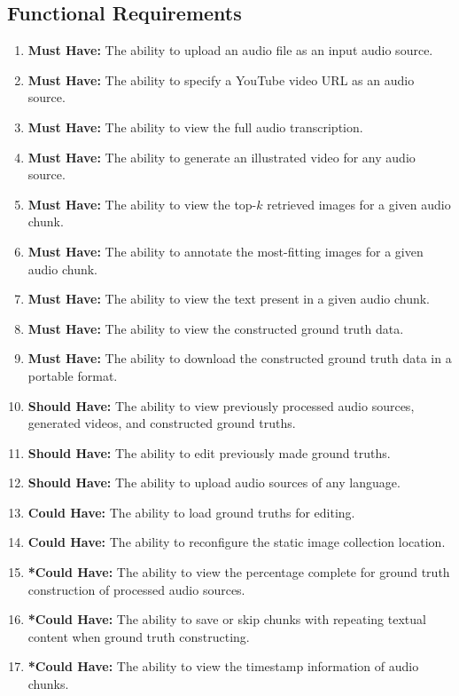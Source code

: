 \documentclass{l4proj}
\begin{document}
\subsection{Functional Requirements}
\begin{enumerate}
    \item \label{req:1} \textbf{Must Have:} The ability to upload an audio file as an input audio source.
    \item \label{req:2} \textbf{Must Have:} The ability to specify a YouTube video URL as an audio source.
    \item \label{req:3} \textbf{Must Have:} The ability to view the full audio transcription.
    \item \label{req:4} \textbf{Must Have:} The ability to generate an illustrated video for any audio source.
    \item \label{req:5} \textbf{Must Have:} The ability to view the top-$k$ retrieved images for a given audio chunk.
    \item \label{req:6} \textbf{Must Have:} The ability to annotate the most-fitting images for a given audio chunk.
    \item \label{req:7} \textbf{Must Have:} The ability to view the text present in a given audio chunk.
    \item \label{req:8} \textbf{Must Have:} The ability to view the constructed ground truth data.
    \item \label{req:9} \textbf{Must Have:} The ability to download the constructed ground truth data in a portable format.
    \item \label{req:10} \textbf{Should Have:} The ability to view previously processed audio sources, generated videos, and constructed ground truths.
    \item \label{req:11} \textbf{Should Have:} The ability to edit previously made ground truths.
    \item \label{req:12} \textbf{Should Have:} The ability to upload audio sources of any language.
    \item \label{req:13} \textbf{Could Have:} The ability to load ground truths for editing.
    \item \label{req:14} \textbf{Could Have:} The ability to reconfigure the static image collection location.
    \item \label{req:15} \textbf{*Could Have:} The ability to view the percentage complete for ground truth construction of processed audio sources.
    \item \label{req:16} \textbf{*Could Have:} The ability to save or skip chunks with repeating textual content when ground truth constructing.
    \item \label{req:17} \textbf{*Could Have:} The ability to view the timestamp information of audio chunks.
\end{enumerate}
\end{document}
